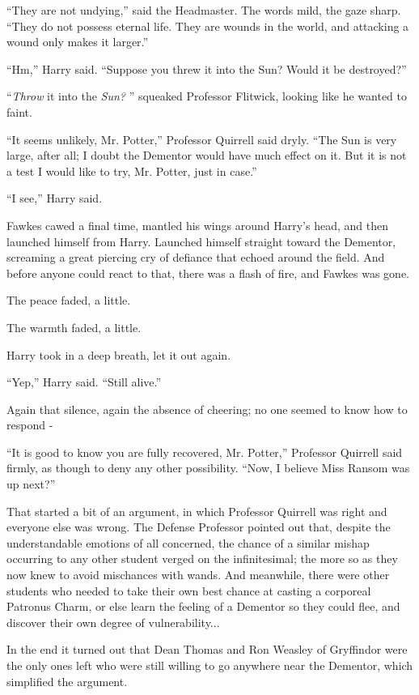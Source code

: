 ``They are not undying,'' said the Headmaster. The words mild, the gaze
sharp. ``They do not possess eternal life. They are wounds in the world,
and attacking a wound only makes it larger.''

``Hm,'' Harry said. ``Suppose you threw it into the Sun? Would it be
destroyed?''

``\emph{Throw} it into the \emph{Sun?} '' squeaked Professor Flitwick,
looking like he wanted to faint.

``It seems unlikely, Mr. Potter,'' Professor Quirrell said dryly. ``The
Sun is very large, after all; I doubt the Dementor would have much
effect on it. But it is not a test I would like to try, Mr. Potter, just
in case.''

``I see,'' Harry said.

Fawkes cawed a final time, mantled his wings around Harry's head, and
then launched himself from Harry. Launched himself straight toward the
Dementor, screaming a great piercing cry of defiance that echoed around
the field. And before anyone could react to that, there was a flash of
fire, and Fawkes was gone.

The peace faded, a little.

The warmth faded, a little.

Harry took in a deep breath, let it out again.

``Yep,'' Harry said. ``Still alive.''

Again that silence, again the absence of cheering; no one seemed to know
how to respond -

``It is good to know you are fully recovered, Mr. Potter,'' Professor
Quirrell said firmly, as though to deny any other possibility. ``Now, I
believe Miss Ransom was up next?''

That started a bit of an argument, in which Professor Quirrell was right
and everyone else was wrong. The Defense Professor pointed out that,
despite the understandable emotions of all concerned, the chance of a
similar mishap occurring to any other student verged on the
infinitesimal; the more so as they now knew to avoid mischances with
wands. And meanwhile, there were other students who needed to take their
own best chance at casting a corporeal Patronus Charm, or else learn the
feeling of a Dementor so they could flee, and discover their own degree
of vulnerability...

In the end it turned out that Dean Thomas and Ron Weasley of Gryffindor
were the only ones left who were still willing to go anywhere near the
Dementor, which simplified the argument.


